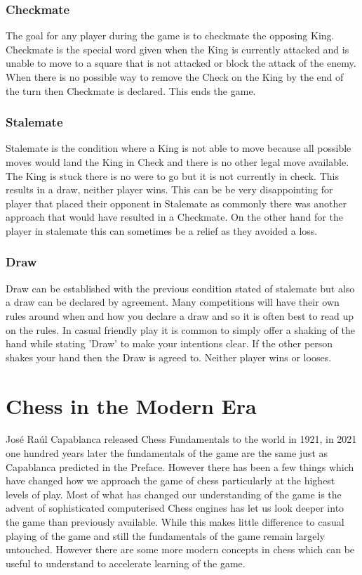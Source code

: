 \documentclass[11pt,a4paper]{book}
\begin{document}
\subsection*{Checkmate}

The goal for any player during the game is to checkmate the opposing King. Checkmate is the special word given when the King is currently attacked and is unable to move to a square that is not attacked or block the attack of the enemy.
When there is no possible way to remove the Check on the King by the end of the turn then Checkmate is declared. This ends the game.
 
\subsection*{Stalemate}

Stalemate is the condition where a King is not able to move because all possible moves would land the King in Check and there is no other legal move available. The King is stuck there is no were to go but it is not currently in check. This results in a draw, neither player wins. This can be be very disappointing for player that placed their opponent in Stalemate as commonly there was another approach that would have resulted in a Checkmate. On the other hand for the player in stalemate this can sometimes be a relief as they avoided a loss.

\subsection*{Draw}

Draw can be established with the previous condition stated of stalemate but also a draw can be declared by agreement. Many competitions will have their own rules around when and how you declare a draw and so it is often best to read up on the rules. In casual friendly play it is common to simply offer a shaking of the hand while stating 'Draw' to make your intentions clear. If the other person shakes your hand then the Draw is agreed to. Neither player wins or looses.

\chapter{Chess in the Modern Era}

José Raúl Capablanca released Chess Fundamentals to the world in 1921, in 2021 one hundred years later the fundamentals of the game are the same just as Capablanca predicted in the Preface. However there has been a few things which have changed how we approach the game of chess particularly at the highest levels of play. Most of what has changed our understanding of the game is the advent of sophisticated computerised Chess engines has let us look deeper into the game than previously available. While this makes little difference to casual playing of the game and still the fundamentals of the game remain largely untouched. However there are some more modern concepts in chess which can be useful to understand to accelerate learning of the game.
\end{document}
